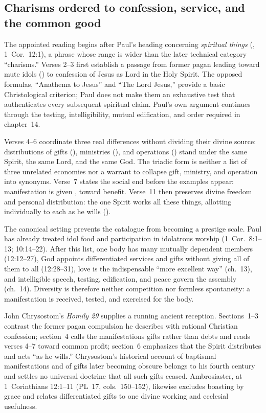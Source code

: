 \sectionguard
\subsection*{Charisms ordered to confession, service, and the common good\enspace{}}

The appointed reading begins after Paul's heading concerning
\emph{spiritual things} (, 1~Cor.~12:1), a phrase
whose range is wider than the later technical category ``charisms.'' Verses 2--3 first establish a passage from former pagan leading
toward mute idols () to confession of Jesus as Lord in
the Holy Spirit. The opposed formulas, ``Anathema to Jesus'' and ``The Lord
Jesus,'' provide a basic Christological criterion; Paul does not make them
an exhaustive test that authenticates every subsequent spiritual claim.
Paul's own argument continues through the testing, intelligibility, mutual
edification, and order required in chapter~14.

Verses 4--6 coordinate three real differences without dividing their divine
source: distributions of gifts (),
ministries (), and operations
() stand under the same Spirit, the same Lord, and the
same God. The triadic form is neither a list of three unrelated economies nor
a warrant to collapse gift, ministry, and operation into synonyms. Verse~7
states the social end before the examples appear: manifestation is given
, toward benefit. Verse~11 then preserves divine
freedom and personal distribution: the one Spirit works all these things,
allotting individually to each as he wills
().

The canonical setting prevents the catalogue from becoming a prestige scale.
Paul has already treated idol food and participation in idolatrous worship
(1~Cor.~8:1--13; 10:14--22). After this list, one body has many mutually
dependent members (12:12--27), God appoints differentiated services and gifts
without giving all of them to all (12:28--31), love is the indispensable
``more excellent way'' (ch.~13), and intelligible speech, testing, edification,
and peace govern the assembly (ch.~14). Diversity is therefore neither
competition nor formless spontaneity: a manifestation is received, tested,
and exercised for the body.

John Chrysostom's \emph{Homily 29} supplies a running ancient reception.
Sections~1--3 contrast the former pagan compulsion he describes with rational
Christian confession; section~4 calls the manifestations gifts rather than
debts and reads verses 4--7 toward common profit; section~6 emphasizes that
the Spirit distributes and acts ``as he wills.'' Chrysostom's historical
account of baptismal manifestations and of gifts later becoming obscure
belongs to his fourth century and settles no universal doctrine that all such
gifts ceased. Ambrosiaster, at 1~Corinthians 12:1--11 (PL~17,
cols.~150--152), likewise excludes boasting by grace and relates differentiated
gifts to one divine working and ecclesial usefulness.

